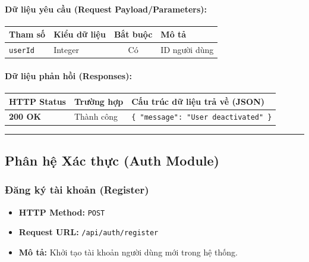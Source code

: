 \documentclass[12pt,a4paper]{article}
\begin{document}
\paragraph{Dữ liệu yêu cầu (Request Payload/Parameters):}
\begin{longtable}{|>{\raggedright\arraybackslash}p{2.8cm}|>{\raggedright\arraybackslash}p{2.2cm}|c|>{\raggedright\arraybackslash}p{7.0cm}|}
\hline
\textbf{Tham số} & \textbf{Kiểu dữ liệu} & \textbf{Bắt buộc} & \textbf{Mô tả} \\ \hline
\endhead
\texttt{userId} & Integer & Có & ID người dùng \\ \hline
\end{longtable}

\paragraph{Dữ liệu phản hồi (Responses):}
\begin{longtable}{|>{\raggedright\arraybackslash}p{2.8cm}|>{\raggedright\arraybackslash}p{3.2cm}|>{\raggedright\arraybackslash}p{8.0cm}|}
\hline
\textbf{HTTP Status} & \textbf{Trường hợp} & \textbf{Cấu trúc dữ liệu trả về (JSON)} \\ \hline
\endhead
\textbf{200 OK} & Thành công & \texttt{\{ "message": "User deactivated" \}} \\ \hline
\end{longtable}

\vskip 0.4cm
\noindent\rule{\textwidth}{0.3pt}
\vskip 0.4cm

\subsection{Phân hệ Xác thực (Auth Module)}

\subsubsection{Đăng ký tài khoản (Register)}
\begin{itemize}[leftmargin=*]
    \item \textbf{HTTP Method:} \texttt{POST}
    \item \textbf{Request URL:} \texttt{/api/auth/register}
    \item \textbf{Mô tả:} Khởi tạo tài khoản người dùng mới trong hệ thống.
\end{itemize}
\end{document}
